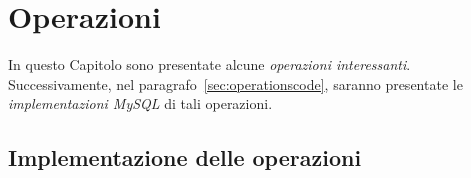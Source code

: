\chapter{Operazioni}\label{ch:operations}
In questo Capitolo sono presentate alcune {\it operazioni interessanti}. Successivamente, nel
paragrafo~\vref{sec:operationscode}, saranno presentate le {\it implementazioni MySQL} di tali operazioni.
\section{Implementazione delle operazioni}\label{sec:operationscode}
